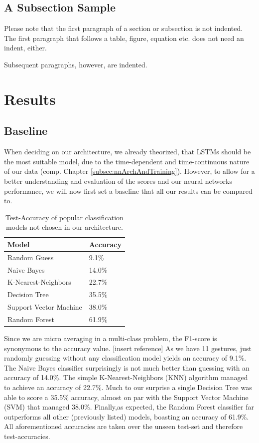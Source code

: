 \documentclass[runningheads]{llncs}
\begin{document}
\subsection{A Subsection Sample}
Please note that the first paragraph of a section or subsection is
not indented. The first paragraph that follows a table, figure,
equation etc. does not need an indent, either.

Subsequent paragraphs, however, are indented.

\section{Results}
\subsection{Baseline}
When deciding on our architecture, we already theorized, that LSTMs should be the most suitable model, due to the time-dependent and time-continuous nature of our data (comp. Chapter \ref{subsec:nnArchAndTraining}). However, to allow for a better understanding and evaluation of the scores and our neural networks performance, we will now first set a baseline that all our results can be compared to. 
\begin{table}
\centering
\caption{Test-Accuracy of popular classification models not chosen in our architecture.}\label{tab:baselineTable}
\begin{tabular}{|l|l|}
    \hline
    Model & Accuracy\\
    \hline
    Random Guess & 9.1\%\\
    Naive Bayes & 14.0\%\\
    K-Nearest-Neighbors & 22.7\%\\
    Decision Tree & 35.5\%\\
    Support Vector Machine & 38.0\%\\
    Random Forest & 61.9\%\\
    \hline
\end{tabular}
\end{table}
Since we are micro averaging in a multi-class problem, the F1-score is synonymous to the accuracy value. [insert reference]
As we have 11 gestures, just randomly guessing without any classification model yields an accuracy of 9.1\%. The Naive Bayes classifier surprisingly is not much better than guessing with an accuracy of 14.0\%. The simple K-Nearest-Neighbors (KNN) algorithm managed to achieve an accuracy of 22.7\%. Much to our surprise a single Decision Tree was able to score a 35.5\% accuracy, almost on par with the Support Vector Machine (SVM) that managed 38.0\%. Finally,as expected, the Random Forest classifier far outperforms all other (previously listed) models, boasting an accuracy of 61.9\%. All aforementioned accuracies are taken over the unseen test-set and therefore test-accuracies.
\end{document}
